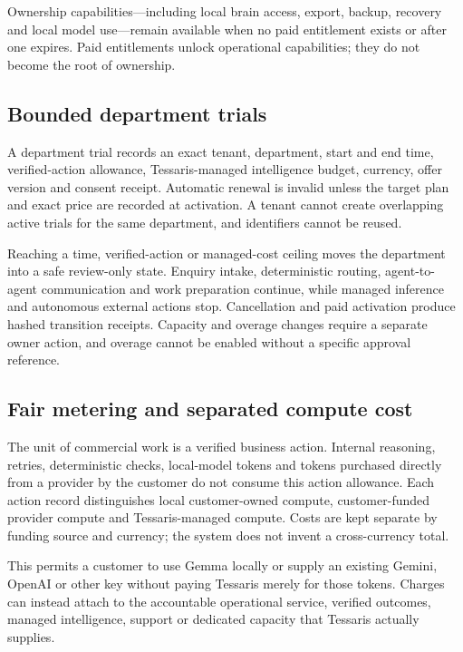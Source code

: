 Ownership capabilities---including local brain access, export, backup, recovery and local model
use---remain available when no paid entitlement exists or after one expires.  Paid entitlements
unlock operational capabilities; they do not become the root of ownership.

\subsection{Bounded department trials}

A department trial records an exact tenant, department, start and end time, verified-action
allowance, Tessaris-managed intelligence budget, currency, offer version and consent receipt.
Automatic renewal is invalid unless the target plan and exact price are recorded at activation.
A tenant cannot create overlapping active trials for the same department, and identifiers cannot
be reused.

Reaching a time, verified-action or managed-cost ceiling moves the department into a safe
review-only state.  Enquiry intake, deterministic routing, agent-to-agent communication and work
preparation continue, while managed inference and autonomous external actions stop.  Cancellation
and paid activation produce hashed transition receipts.  Capacity and overage changes require a
separate owner action, and overage cannot be enabled without a specific approval reference.

\subsection{Fair metering and separated compute cost}

The unit of commercial work is a verified business action.  Internal reasoning, retries,
deterministic checks, local-model tokens and tokens purchased directly from a provider by the
customer do not consume this action allowance.  Each action record distinguishes local
customer-owned compute, customer-funded provider compute and Tessaris-managed compute.  Costs are
kept separate by funding source and currency; the system does not invent a cross-currency total.

This permits a customer to use Gemma locally or supply an existing Gemini, OpenAI or other key
without paying Tessaris merely for those tokens.  Charges can instead attach to the accountable
operational service, verified outcomes, managed intelligence, support or dedicated capacity that
Tessaris actually supplies.

